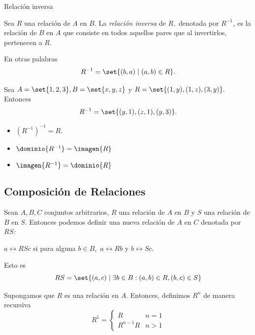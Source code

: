 	{Relación inversa}

	Sea $R$ una relación de $A$ en $B.$ La \emph{relación inversa} de $R,$ denotada por \emph{$R^{-1}$,} es la relación de $B$ en $A$ que consiste en todos aquellos pares que al invertirlos, pertenecen a $R.$

	En otras palabras
	$$
	R^{-1}=\set{(b,a)\mid (a,b)\in R}.
	$$



	\begin{problema}
		Sea $A=\set{1,2,3}, B=\set{x,y,z}$ y $R=\set{(1,y),(1,z),(3,y)}.$ Entonces
		$$
		R^{-1}=\set{(y,1), (z,1), (y,3)}.
		$$
	\end{problema}



	\begin{observacion}
		\begin{itemize}
			\item $\left( R^{-1} \right)^{-1}=R.$
			\item $\dominio{R^{-1}}=\imagen{R}$
			\item $\imagen{R^{-1}}=\dominio{R}$
		\end{itemize}
	\end{observacion}




\subsection{Composición de Relaciones}

	Sean $A,B,C$ conjuntos arbitrarios, $R$ una relación de $A$ en $B$ y $S$ una relación de $B$ en $S.$  Entonces podemos definir una nueva relación de $A$ en $C$ denotada por \emph{$RS$:}
	\begin{center}
		$a\rel{{RS}}c$ si para alguna $b \in B,$ $a\rel{R}b$ y $b\rel{S}c.$
	\end{center}



	Esto es
	$$
	RS=\set{(a,c)\mid \exists b\in B: (a,b)\in R, (b,c)\in S}
	$$



	Supongamos que $R$ es una relación en $A.$ Entonces, definimos $R^{n}$ de manera recursiva
	$$
	R^{1}=
	\begin{cases}
		R & n=1 \\
		R^{n-1}R & n>1
	\end{cases}
	$$








